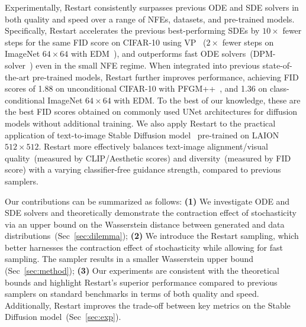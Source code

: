 Experimentally, Restart consistently surpasses previous ODE and SDE solvers in both quality and speed over a range of NFEs, datasets, and pre-trained models. Specifically, Restart accelerates the previous best-performing SDEs by $10\times$ fewer steps for the same FID score on CIFAR-10 using VP~\cite{Song2020ScoreBasedGM} ($2\times$ fewer steps on ImageNet $64\times 64$ with EDM~\cite{Karras2022ElucidatingTD}), and outperforms fast ODE solvers~(\eg DPM-solver~\citep{lu2022dpm}) even in the small NFE regime. When integrated into previous state-of-the-art pre-trained models, Restart further improves performance, achieving FID scores of 1.88 on unconditional CIFAR-10 with PFGM++~\cite{Xu2023PFGMUT}, and 1.36 on class-conditional ImageNet $64\times 64$ with EDM. To the best of our knowledge, these are the best FID scores obtained on commonly used UNet architectures for diffusion models without additional training. We also apply Restart to the practical application of text-to-image Stable Diffusion model~\cite{Rombach2021HighResolutionIS} pre-trained on LAION $512\times 512$. Restart more effectively balances text-image alignment/visual quality~(measured by CLIP/Aesthetic scores) and diversity~(measured by FID score) with a varying classifier-free guidance strength, compared to previous samplers.

Our contributions can be summarized as follows: \textbf{(1)} We investigate ODE and SDE solvers and theoretically demonstrate the contraction effect of stochasticity via an upper bound on the Wasserstein distance between generated and data distributions~(Sec~\ref{sec:dilemma}); \textbf{(2)} We introduce the Restart sampling, which better harnesses the contraction effect of stochasticity while allowing for fast sampling. The sampler results in a smaller Wasserstein upper bound (Sec~\ref{sec:method}); \textbf{(3)} Our experiments are consistent with the theoretical bounds and highlight Restart's superior performance compared to previous samplers on standard benchmarks in terms of both quality and speed. Additionally, Restart improves the trade-off between key metrics on the Stable Diffusion model~(Sec~\ref{sec:exp}).


